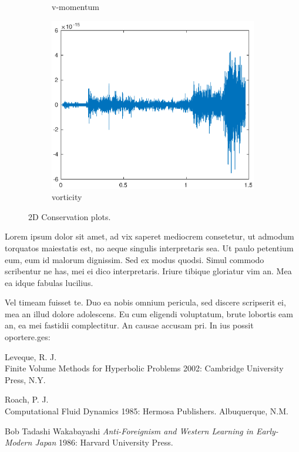 \begin{figure}[htp]
\begin{subfigure}[b]{0.3\textwidth}
        \caption{v-momentum}
        \label{fig:Mass}
    \end{subfigure}
    \hfill
    \begin{subfigure}[b]{0.3\textwidth}
        \centering
        \includegraphics[width=\textwidth]{images/cons_vort.eps}\hfill
        \caption{vorticity}
        \label{Momentum}
    \end{subfigure}
     \hfill
    \caption{2D Conservation plots.}
    \label{fig:three graphs}
\end{figure}

Lorem ipsum dolor sit amet, ad vix saperet mediocrem consetetur, ut admodum torquatos maiestatis est, 
no aeque singulis interpretaris sea. Ut paulo petentium eum, eum id malorum dignissim. Sed ex modus quodsi. 
Simul commodo scribentur ne has, mei ei dico interpretaris. Iriure tibique gloriatur vim an. Mea ea idque 
fabulas lucilius.

Vel timeam fuisset te. Duo ea nobis omnium pericula, sed discere scripserit ei, mea an illud dolore adolescens.
 Eu cum eligendi voluptatum, brute lobortis eam an, ea mei fastidii complectitur. An causae accusam pri. 
 In ius possit oportere.ges:



\begin{thebibliography}{1}

  Leveque, R. J. {\\Finite Volume Methods for Hyperbolic Problems} 2002:
Cambridge University Press, N.Y.

 Roach, P. J. {\\Computational Fluid Dynamics} 1985: Hermosa Publishers. Albuquerque, N.M.

 Bob Tadashi Wakabayashi {\em Anti-Foreignism and Western
Learning in Early-Modern Japan} 1986: Harvard University Press.

\end{thebibliography}